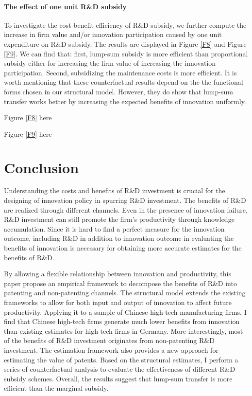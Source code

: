 \documentclass[English]{article}
\begin{document}
\paragraph{The effect of one unit R\&D subsidy} To investigate the cost-benefit efficiency of R\&D subsidy, we further compute the increase in firm value and/or innovation participation caused by one unit expenditure on R\&D subsidy. The results are displayed in Figure \ref{F8} and Figure \ref{F9}. We can find that: first, lump-sum subsidy is more efficient than proportional subsidy either for increasing the firm value of increasing the innovation participation. Second, subsidizing the maintenance costs is more efficient. It is worth mentioning that these counterfactual results depend on the the functional forms chosen in our structural model. However, they do show that lump-sum transfer works better by increasing the expected benefits of innovation uniformly. 
\begin{center}
Figure \ref{F8} here
\end{center}

\begin{center}
Figure \ref{F9} here
\end{center}

\section{Conclusion}
Understanding the costs and benefits of R\&D investment is crucial for the designing of innovation policy in spurring R\&D investment. The benefits of R\&D are realized through different channels. Even in the presence of innovation failure, R\&D investment can still promote the firm's productivity through knowledge accumulation. Since it is hard to find a perfect measure for the innovation outcome, including R\&D in addition to innovation outcome in evaluating the benefits of innovation is necessary for obtaining more accurate estimates for the benefits of R\&D. 

By allowing a flexible relationship between innovation and productivity, this paper propose an empirical framework to decompose the benefits of R\&D into patenting and non-patenting channels. The structural model extends the existing frameworks to allow for both input and output of innovation to affect future productivity. Applying it to a sample of Chinese high-tech manufacturing firms, I find that Chinese high-tech firms generate much lower benefits from innovation than existing estimates for high-tech firms in Germany. More interestingly, most of the benefits of R\&D investment originates from non-patenting R\&D investment. The estimation framework also provides a new approach for estimating the value of patents. Based on the structural estimates, I perform a series of counterfactual analysis to evaluate the effectiveness of different R\&D subsidy schemes. Overall, the results suggest that lump-sum transfer is more efficient than the marginal subsidy. 
\end{document}
